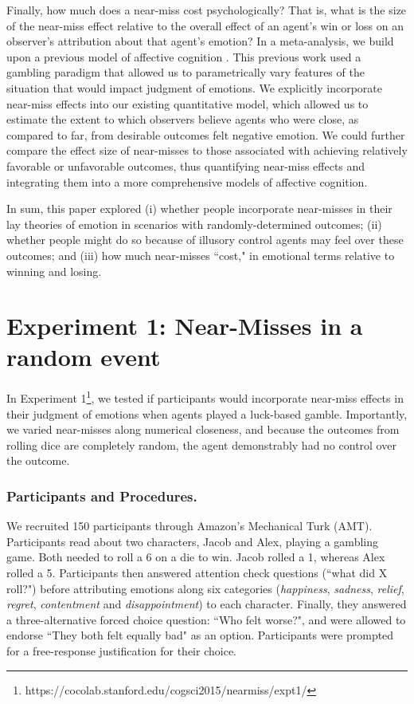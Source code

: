\documentclass[10pt,letterpaper]{article}
\begin{document}
	
	Finally, how much does a near-miss cost psychologically? That is, what is the size of the near-miss effect relative to the overall effect of an agent's win or loss on an observer's attribution about that agent's emotion? In a meta-analysis, we build upon a previous model of affective cognition \cite{OngAffCog}. This previous work used a gambling paradigm that allowed us to parametrically vary features of the situation that would impact judgment of emotions. We explicitly incorporate near-miss effects into our existing quantitative model, which allowed us to estimate the extent to which observers believe agents who were close, as compared to far, from desirable outcomes felt negative emotion.  We could further compare the effect size of near-misses to those associated with achieving relatively favorable or unfavorable outcomes, thus quantifying near-miss effects and integrating them into a more comprehensive models of affective cognition.  


	In sum, this paper explored (i) whether people incorporate near-misses in their lay theories of emotion in scenarios with randomly-determined outcomes; (ii) whether people might do so because of illusory control agents may feel over these outcomes; and (iii) how much near-misses ``cost," in emotional terms relative to winning and losing.








\section{Experiment 1: Near-Misses in a random event}

	In Experiment 1\footnote{https://cocolab.stanford.edu/cogsci2015/nearmiss/expt1/}, we tested if participants would incorporate near-miss effects in their judgment of emotions when agents played a luck-based gamble. Importantly, we varied near-misses along numerical closeness, and because the outcomes from rolling dice are completely random, the agent demonstrably had no control over the outcome.

\subsubsection{Participants and Procedures.} We recruited 150 participants through Amazon's Mechanical Turk (AMT). Participants read about two characters, Jacob and Alex, playing a gambling game. Both needed to roll a 6 on a die to win. Jacob rolled a 1, whereas Alex rolled a 5. Participants then answered attention check questions (``what did X roll?") before attributing emotions along six categories (\textit{happiness}, \textit{sadness}, \textit{relief}, \textit{regret}, \textit{contentment} and \textit{disappointment})  to each character. Finally, they answered a three-alternative forced choice question: ``Who felt worse?", and were allowed to endorse ``They both felt equally bad" as an option. Participants were prompted for a free-response justification for their choice.
\end{document}
